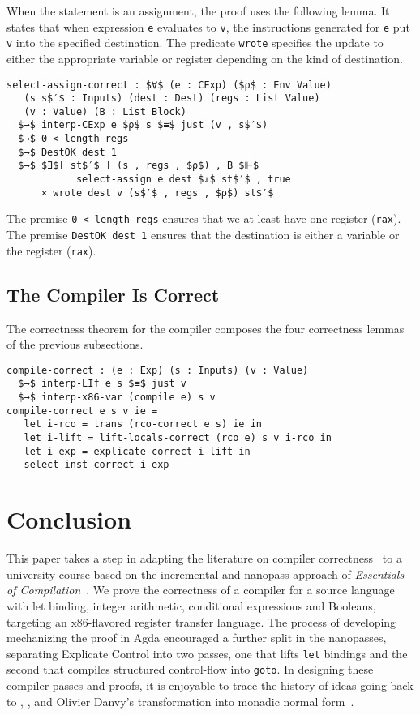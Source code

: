 \documentclass[sigplan,screen]{acmart}
\begin{document}
When the statement is an assignment, the proof uses the following
lemma. It states that when expression \lstinline{e} evaluates to
\lstinline{v}, the instructions generated for \lstinline{e} put
\lstinline{v} into the specified destination. The predicate
\lstinline{wrote} specifies the update to either the appropriate
variable or register depending on the kind of destination.

\begin{lstlisting}
select-assign-correct : $∀$ (e : CExp) ($ρ$ : Env Value)
   (s s$′$ : Inputs) (dest : Dest) (regs : List Value)
   (v : Value) (B : List Block) 
  $→$ interp-CExp e $ρ$ s $≡$ just (v , s$′$)
  $→$ 0 < length regs
  $→$ DestOK dest 1
  $→$ $∃$[ st$′$ ] (s , regs , $ρ$) , B $⊩$
            select-assign e dest $⇓$ st$′$ , true
      × wrote dest v (s$′$ , regs , $ρ$) st$′$
\end{lstlisting}

\noindent The premise \lstinline{0 < length regs} ensures that we at
least have one register (\lstinline{rax}). The premise
\lstinline{DestOK dest 1} ensures that the destination is either a
variable or the register (\lstinline{rax}).

\subsection{The Compiler Is Correct}

The correctness theorem for the compiler composes the four correctness
lemmas of the previous subsections.

\begin{lstlisting}[basicstyle=\ttfamily\footnotesize]
compile-correct : (e : Exp) (s : Inputs) (v : Value)
  $→$ interp-LIf e s $≡$ just v
  $→$ interp-x86-var (compile e) s v
compile-correct e s v ie =
   let i-rco = trans (rco-correct e s) ie in
   let i-lift = lift-locals-correct (rco e) s v i-rco in
   let i-exp = explicate-correct i-lift in
   select-inst-correct i-exp
\end{lstlisting}


\section{Conclusion}
\label{sec:conclusion}

This paper takes a step in adapting the literature on compiler
correctness~\citep{Leroy:2006fe,Kumar:2014aa} to a university course
based on the incremental and nanopass approach of \emph{Essentials of
Compilation}~\citep{Siek:2023tr,Siek:2023ue}. We prove the correctness
of a compiler for a source language with let binding, integer
arithmetic, conditional expressions and Booleans, targeting an
x86-flavored register transfer language. The process of developing
mechanizing the proof in Agda encouraged a further split in the
nanopasses, separating Explicate Control into two passes, one that
lifts \lstinline{let} bindings and the second that compiles structured
control-flow into \lstinline{goto}. In designing these compiler passes
and proofs, it is enjoyable to trace the history of ideas going back
to \citet{Aho:1986qf}, \citet{Dybvig:1990aa}, and Olivier Danvy's
transformation into monadic normal form~\citep{Danvy:2003fk}.
\end{document}
